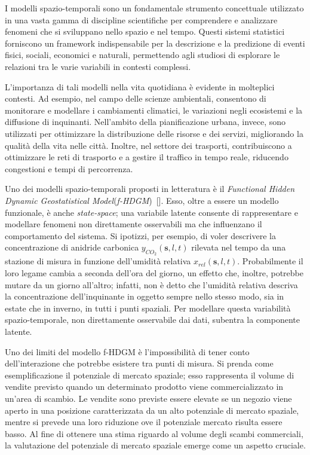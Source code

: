
I modelli spazio-temporali sono un fondamentale strumento concettuale utilizzato in una vasta gamma di discipline scientifiche per comprendere e analizzare fenomeni che si sviluppano nello spazio e nel tempo. Questi sistemi statistici forniscono un framework indispensabile per la descrizione e la predizione di eventi fisici, sociali, economici e naturali, permettendo agli studiosi di esplorare le relazioni tra le varie variabili in contesti complessi.
\par L'importanza di tali modelli nella vita quotidiana è evidente in molteplici contesti. Ad esempio, nel campo delle scienze ambientali, consentono di monitorare e modellare i cambiamenti climatici, le variazioni negli ecosistemi e la diffusione di inquinanti. Nell'ambito della pianificazione urbana, invece, sono utilizzati per ottimizzare la distribuzione delle risorse e dei servizi, migliorando la qualità della vita nelle città. Inoltre, nel settore dei trasporti, contribuiscono a ottimizzare le reti di trasporto e a gestire il traffico in tempo reale, riducendo congestioni e tempi di percorrenza.
\par Uno dei modelli spazio-temporali proposti in letteratura è il \textit{Functional Hidden Dynamic Geostatistical Model}(\textit{f-HDGM})~[\cite{paper_f_HDGM}]. Esso, oltre a essere un modello funzionale, è anche \textit{state-space}; una variabile latente consente di rappresentare e modellare fenomeni non direttamente osservabili ma che influenzano il comportamento del sistema. Si ipotizzi, per esempio, di voler descrivere la concentrazione di anidride carbonica $y_{CO_2}(\mathbf{s}, l, t)$ rilevata nel tempo da una stazione di misura in funzione dell'umidità relativa $x_{rel}(\mathbf{s}, l, t)$. Probabilmente il loro legame cambia a seconda dell'ora del giorno, un effetto che, inoltre, potrebbe mutare da un giorno all'altro; infatti, non è detto che l'umidità relativa descriva la concentrazione dell'inquinante in oggetto sempre nello stesso modo, sia in estate che in inverno, in tutti i punti spaziali. Per modellare questa variabilità spazio-temporale, non direttamente osservabile dai dati, subentra la componente latente.
\par Uno dei limiti del modello f-HDGM è l'impossibilità di tener conto dell'interazione che potrebbe esistere tra punti di misura. Si prenda come esemplificazione il potenziale di mercato spaziale; esso rappresenta il volume di vendite previsto quando un determinato prodotto viene commercializzato in un'area di scambio. Le vendite sono previste essere elevate se un negozio viene aperto in una posizione caratterizzata da un alto potenziale di mercato spaziale, mentre si prevede una loro riduzione ove il potenziale mercato risulta essere basso. Al fine di ottenere una stima riguardo al volume degli scambi commerciali, la valutazione del potenziale di mercato spaziale emerge come un aspetto cruciale. 
